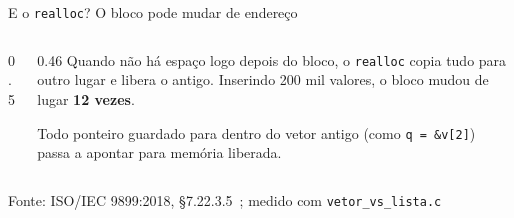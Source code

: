 \documentclass[aspectratio=169]{beamer}
\newcommand{\fonte}[1]{\vfill\hfill{\scriptsize\textcolor{UFSGray}{Fonte: #1}}}
\begin{document}
\begin{frame}{E o \texttt{realloc}? O bloco pode mudar de endereço}
  \begin{columns}[c]
    \begin{column}{0.5\textwidth}
      \begin{center}
      \end{center}
    \end{column}
    \begin{column}{0.46\textwidth}
      \small
      Quando não há espaço logo depois do bloco, o \texttt{realloc}
      copia tudo para outro lugar e libera o antigo. Inserindo 200 mil
      valores, o bloco mudou de lugar \textbf{12 vezes}.

      \medskip
      Todo ponteiro guardado para dentro do vetor antigo (como
      \texttt{q = \&v[2]}) passa a apontar para memória liberada.
    \end{column}
  \end{columns}
  \fonte{ISO/IEC 9899:2018, §7.22.3.5~\cite{iso2018c17};
    medido com \texttt{vetor\_vs\_lista.c}}
\end{frame}
\end{document}
